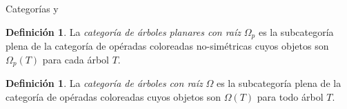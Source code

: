 \documentclass[12pt,aspectratio=169]{beamer}
\numberwithin{equation}{section}
\theoremstyle{definition}
\newtheorem{defi}[teo]{Definici\'on}
\begin{document}
{\begin{frame}{Categor\'ias  y \pmb{$\Omega$}}
    \begin{defi}
        La \emph{categor\'ia de \'arboles planares con ra\'iz} $\Omega_p$ es la subcategor\'ia plena de la categor\'ia de op\'eradas coloreadas no-sim\'etricas cuyos objetos son $\Omega_p(T)$ para cada \'arbol $T$.

    \end{defi}
    \begin{defi}
        La \emph{categor\'ia de \'arboles con ra\'iz} $\Omega$ es la subcategor\'ia plena de la categor\'ia de op\'eradas coloreadas cuyos objetos son $\Omega(T)$ para todo \'arbol $T$.


\end{defi}
\end{frame}}
\end{document}
